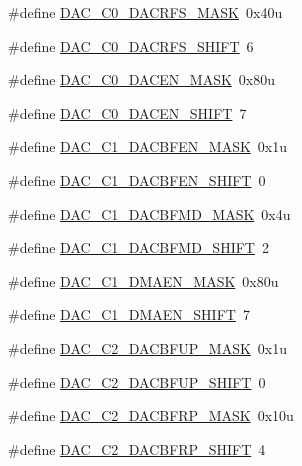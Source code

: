 \begin{DoxyCompactItemize}
\item 
\#define \hyperlink{group___d_a_c___register___masks_gadc1973eafb50599b83de95422477a1f5}{D\+A\+C\+\_\+\+C0\+\_\+\+D\+A\+C\+R\+F\+S\+\_\+\+M\+A\+SK}~0x40u
\item 
\#define \hyperlink{group___d_a_c___register___masks_ga495d0702c9899844340d198120a77e33}{D\+A\+C\+\_\+\+C0\+\_\+\+D\+A\+C\+R\+F\+S\+\_\+\+S\+H\+I\+FT}~6
\item 
\#define \hyperlink{group___d_a_c___register___masks_ga6865b52ae9a9275ef4db48eb3eb5d62a}{D\+A\+C\+\_\+\+C0\+\_\+\+D\+A\+C\+E\+N\+\_\+\+M\+A\+SK}~0x80u
\item 
\#define \hyperlink{group___d_a_c___register___masks_gae8835f0083d5a4e588402a32047e95cb}{D\+A\+C\+\_\+\+C0\+\_\+\+D\+A\+C\+E\+N\+\_\+\+S\+H\+I\+FT}~7
\item 
\#define \hyperlink{group___d_a_c___register___masks_ga61aa82d21d0c84ff4fe42d0856c506bd}{D\+A\+C\+\_\+\+C1\+\_\+\+D\+A\+C\+B\+F\+E\+N\+\_\+\+M\+A\+SK}~0x1u
\item 
\#define \hyperlink{group___d_a_c___register___masks_ga2062351429a9e737c0ac434488b59fe4}{D\+A\+C\+\_\+\+C1\+\_\+\+D\+A\+C\+B\+F\+E\+N\+\_\+\+S\+H\+I\+FT}~0
\item 
\#define \hyperlink{group___d_a_c___register___masks_ga28373e4d9ae322da4f6a37933a340b78}{D\+A\+C\+\_\+\+C1\+\_\+\+D\+A\+C\+B\+F\+M\+D\+\_\+\+M\+A\+SK}~0x4u
\item 
\#define \hyperlink{group___d_a_c___register___masks_ga779629844ed0967b310e7f2721c54624}{D\+A\+C\+\_\+\+C1\+\_\+\+D\+A\+C\+B\+F\+M\+D\+\_\+\+S\+H\+I\+FT}~2
\item 
\#define \hyperlink{group___d_a_c___register___masks_ga091be41dfd851b71978ab7298c372292}{D\+A\+C\+\_\+\+C1\+\_\+\+D\+M\+A\+E\+N\+\_\+\+M\+A\+SK}~0x80u
\item 
\#define \hyperlink{group___d_a_c___register___masks_ga481f558223c5c36402bebe924bdd00a3}{D\+A\+C\+\_\+\+C1\+\_\+\+D\+M\+A\+E\+N\+\_\+\+S\+H\+I\+FT}~7
\item 
\#define \hyperlink{group___d_a_c___register___masks_ga329015367026aaee34f54edcbaab61bb}{D\+A\+C\+\_\+\+C2\+\_\+\+D\+A\+C\+B\+F\+U\+P\+\_\+\+M\+A\+SK}~0x1u
\item 
\#define \hyperlink{group___d_a_c___register___masks_ga5d43a79719748e490a572fa6cdc75efe}{D\+A\+C\+\_\+\+C2\+\_\+\+D\+A\+C\+B\+F\+U\+P\+\_\+\+S\+H\+I\+FT}~0
\item 
\#define \hyperlink{group___d_a_c___register___masks_ga64b53e5effabf2e736fca6088752e6ea}{D\+A\+C\+\_\+\+C2\+\_\+\+D\+A\+C\+B\+F\+R\+P\+\_\+\+M\+A\+SK}~0x10u
\item 
\#define \hyperlink{group___d_a_c___register___masks_ga0ab880f693c25ecf491d3b76df611456}{D\+A\+C\+\_\+\+C2\+\_\+\+D\+A\+C\+B\+F\+R\+P\+\_\+\+S\+H\+I\+FT}~4
\end{DoxyCompactItemize}


